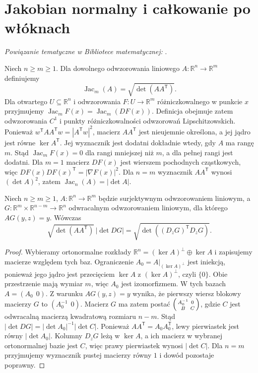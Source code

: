 \section{Jakobian normalny i całkowanie po włóknach}

\noindent\emph{Powiązanie tematyczne w Bibliotece matematycznej:} .

\begin{definicja}
\label{def:normal-jacobian-28}
Niech $n\ge m\ge1$. Dla dowolnego odwzorowania
liniowego $A:\mathbb R^n\to\mathbb R^m$ definiujemy
\[
 \operatorname{Jac}_m(A)=\sqrt{\det(AA^{\mathsf T})}.
\]
Dla otwartego $U\subseteq\mathbb R^n$ i odwzorowania
$F:U\to\mathbb R^m$ różniczkowalnego
w punkcie $x$ przyjmujemy
$\operatorname{Jac}_mF(x)=\operatorname{Jac}_m(DF(x))$.
Definicja obejmuje zatem odwzorowania $C^1$ i punkty
różniczkowalności odwzorowań Lipschitzowskich.
Ponieważ $w^{\mathsf T}AA^{\mathsf T}w=|A^{\mathsf T}w|^2$,
macierz $AA^{\mathsf T}$ jest nieujemnie określona,
a jej jądro jest równe $\ker A^{\mathsf T}$.
Jej wyznacznik jest dodatni dokładnie wtedy, gdy
$A$ ma rangę $m$. Stąd $\operatorname{Jac}_mF(x)=0$
dla rangi mniejszej niż $m$, a dla pełnej rangi
jest dodatni. Dla $m=1$ macierz $DF(x)$ jest
wierszem pochodnych cząstkowych, więc
$DF(x)DF(x)^{\mathsf T}=|\nabla F(x)|^2$.
Dla $n=m$ wyznacznik $AA^{\mathsf T}$ wynosi
$(\det A)^2$, zatem $\operatorname{Jac}_n(A)=|\det A|$.
\end{definicja}

\begin{lemat}
\label{lem:linear-coarea-28}
Niech $n\ge m\ge1$, $A:\mathbb R^n\to\mathbb R^m$
będzie surjektywnym odwzorowaniem liniowym, a
$G:\mathbb R^m\times\mathbb R^{n-m}\to\mathbb R^n$
odwracalnym odwzorowaniem liniowym, dla którego
$AG(y,z)=y$. Wówczas
\[
 \sqrt{\det(AA^{\mathsf T})}\,|\det DG|
 =\sqrt{\det((D_zG)^{\mathsf T}D_zG)}.
\]
\end{lemat}
\begin{proof}
Wybieramy ortonormalne rozkłady
$\mathbb R^n=(\ker A)^\perp\oplus\ker A$
i zapisujemy macierze względem tych baz.
Ograniczenie $A_0=A|_{(\ker A)^\perp}$
jest iniekcją, ponieważ jego jądro jest przecięciem
$\ker A$ z $(\ker A)^\perp$, czyli $\{0\}$.
Obie przestrzenie mają wymiar $m$, więc $A_0$
jest izomorfizmem. W tych bazach $A=(A_0\ \ 0)$.
Z warunku $AG(y,z)=y$ wynika, że pierwszy
wiersz blokowy macierzy $G$ to $(A_0^{-1}\ \ 0)$.
Macierz $G$ ma zatem postać
$\begin{psmallmatrix} A_0^{-1}&0\\B&C\end{psmallmatrix}$,
gdzie $C$ jest odwracalną macierzą kwadratową
rozmiaru $n-m$. Stąd
$|\det DG|=|\det A_0|^{-1}|\det C|$.
Ponieważ $AA^{\mathsf T}=A_0A_0^{\mathsf T}$,
lewy pierwiastek jest równy $|\det A_0|$.
Kolumny $D_zG$ leżą w $\ker A$, a ich macierz
w wybranej ortonormalnej bazie jest $C$,
więc prawy pierwiastek wynosi $|\det C|$.
Dla $n=m$ przyjmujemy wyznacznik pustej
macierzy równy $1$ i dowód pozostaje poprawny.
\end{proof}


